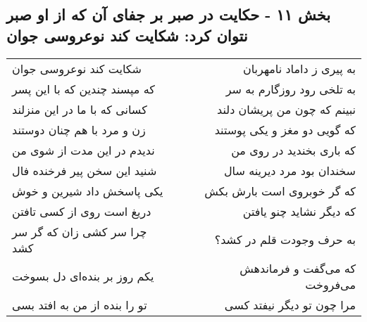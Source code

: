 \begin{center}
\section*{بخش ۱۱ - حکایت در صبر بر جفای آن که از او صبر نتوان کرد: شکایت کند نوعروسی جوان}
\label{sec:011}
\begin{longtable}{l p{0.5cm} r}
شکایت کند نوعروسی جوان
&&
به پیری ز داماد نامهربان
\\
که مپسند چندین که با این پسر
&&
به تلخی رود روزگارم به سر
\\
کسانی که با ما در این منزلند
&&
نبینم که چون من پریشان دلند
\\
زن و مرد با هم چنان دوستند
&&
که گویی دو مغز و یکی پوستند
\\
ندیدم در این مدت از شوی من
&&
که باری بخندید در روی من
\\
شنید این سخن پیر فرخنده فال
&&
سخندان بود مرد دیرینه سال
\\
یکی پاسخش داد شیرین و خوش
&&
که گر خوبروی است بارش بکش
\\
دریغ است روی از کسی تافتن
&&
که دیگر نشاید چنو یافتن
\\
چرا سر کشی زان که گر سر کشد
&&
به حرف وجودت قلم در کشد؟
\\
یکم روز بر بنده‌ای دل بسوخت
&&
که می‌گفت و فرماندهش می‌فروخت
\\
تو را بنده از من به افتد بسی
&&
مرا چون تو دیگر نیفتد کسی
\\
\end{longtable}
\end{center}
